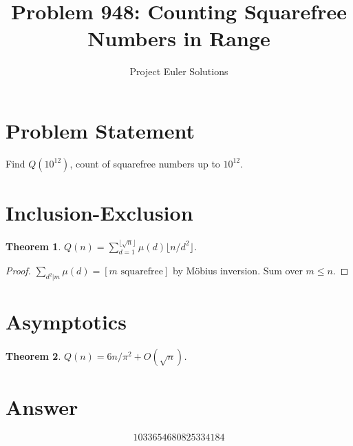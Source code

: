 \documentclass[11pt]{article}
\title{Problem 948: Counting Squarefree Numbers in Range}
\author{Project Euler Solutions}
\date{}
\newtheorem{theorem}{Theorem}
\theoremstyle{definition}
\begin{document}
\maketitle

\section{Problem Statement}
Find $Q(10^{12})$, count of squarefree numbers up to $10^{12}$.

\section{Inclusion-Exclusion}
\begin{theorem}
$Q(n) = \sum_{d=1}^{\lfloor\sqrt{n}\rfloor} \mu(d) \lfloor n/d^2 \rfloor$.
\end{theorem}

\begin{proof}
$\sum_{d^2|m} \mu(d) = [m \text{ squarefree}]$ by M\"obius inversion. Sum over $m \leq n$.
\end{proof}

\section{Asymptotics}
\begin{theorem}
$Q(n) = 6n/\pi^2 + O(\sqrt{n})$.
\end{theorem}

\section{Answer}

\[
\boxed{1033654680825334184}
\]
\end{document}
